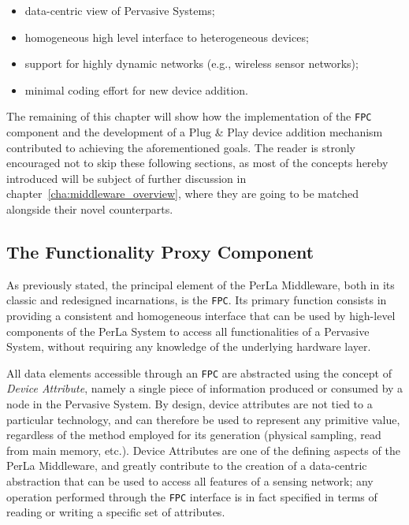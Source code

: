 \begin{itemize}

    \item data-centric view of Pervasive Systems;

    \item homogeneous high level interface to heterogeneous
        devices;

    \item support for highly dynamic networks (e.g., wireless
        sensor networks);

    \item minimal coding effort for new device addition.

\end{itemize}

The remaining of this chapter will show how the implementation of the
\texttt{FPC} component and the development of a Plug \& Play device addition
mechanism contributed to achieving the aforementioned goals. The reader is
stronly encouraged not to skip these following sections, as most of the
concepts hereby introduced will be subject of further discussion in
chapter~\ref{cha:middleware_overview}, where they are going to be matched
alongside their novel counterparts.

\subsection{The Functionality Proxy Component}

As previously stated, the principal element of the PerLa Middleware, both in
its classic and redesigned incarnations, is the \texttt{FPC}. Its primary
function consists in providing a consistent and homogeneous interface that can
be used by high-level components of the PerLa System to access all
functionalities of a Pervasive System, without requiring any knowledge of the
underlying hardware layer.

All data elements accessible through an \texttt{FPC} are abstracted using the
concept of \textit{Device Attribute}, namely a single piece of information
produced or consumed by a node in the Pervasive System. By design, device
attributes are not tied to a particular technology, and can therefore be used
to represent any primitive value, regardless of the method employed for its
generation (physical sampling, read from main memory, etc.). Device Attributes
are one of the defining aspects of the PerLa Middleware, and greatly contribute
to the creation of a data-centric abstraction that can be used to access all
features of a sensing network; any operation performed through the \texttt{FPC}
interface is in fact specified in terms of reading or writing a specific set of
attributes.

